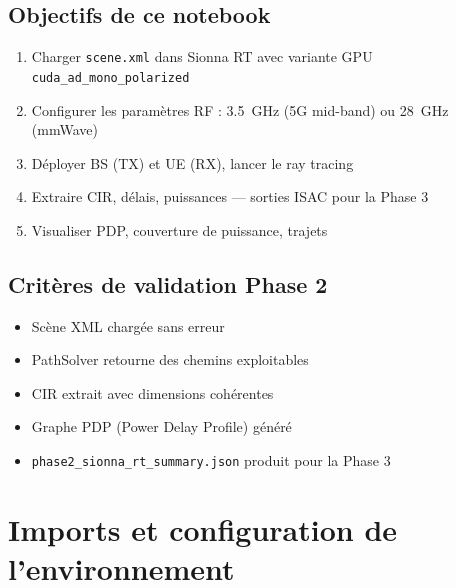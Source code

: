 \documentclass[11pt,a4paper]{article}
\begin{document}
\subsection*{Objectifs de ce notebook}
\begin{enumerate}
    \item Charger \texttt{scene.xml} dans Sionna RT avec variante GPU \texttt{cuda\_ad\_mono\_polarized}
    \item Configurer les paramètres RF : 3.5~GHz (5G mid-band) ou 28~GHz (mmWave)
    \item Déployer BS (TX) et UE (RX), lancer le ray tracing
    \item Extraire CIR, délais, puissances --- sorties ISAC pour la Phase 3
    \item Visualiser PDP, couverture de puissance, trajets
\end{enumerate}

\subsection*{Critères de validation Phase 2}
\begin{itemize}
    \item[\checkmark] Scène XML chargée sans erreur
    \item[\checkmark] PathSolver retourne des chemins exploitables
    \item[\checkmark] CIR extrait avec dimensions cohérentes
    \item[\checkmark] Graphe PDP (Power Delay Profile) généré
    \item[\checkmark] \texttt{phase2\_sionna\_rt\_summary.json} produit pour la Phase 3
\end{itemize}

\section{Imports et configuration de l'environnement}
\end{document}
